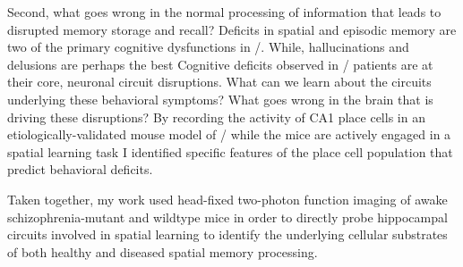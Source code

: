Second, what goes wrong in the normal processing of information that leads to disrupted memory storage and recall?
Deficits in spatial and episodic memory are two of the primary cognitive dysfunctions in \scz/.
While, hallucinations and delusions are perhaps the best 
Cognitive deficits observed in \scz/ patients are at their core, neuronal circuit disruptions.
What can we learn about the circuits underlying these behavioral symptoms?
What goes wrong in the brain that is driving these disruptions?
By recording the activity of CA1 place cells in an etiologically-validated mouse model of \scz/ while the mice are actively engaged in a spatial learning task I identified specific features of the place cell population that predict behavioral deficits.

Taken together, my work used head-fixed two-photon function imaging of awake schizophrenia-mutant and wildtype mice in order to directly probe hippocampal circuits involved in spatial learning to identify the underlying cellular substrates of both healthy and diseased spatial memory processing.






